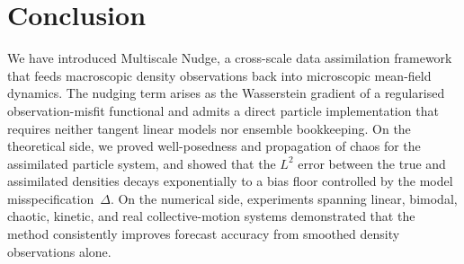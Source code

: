 \section{Conclusion}

We have introduced Multiscale Nudge, a cross-scale data assimilation
framework that feeds macroscopic density observations back into
microscopic mean-field dynamics. The nudging term arises as the
Wasserstein gradient of a regularised observation-misfit functional and
admits a direct particle implementation that requires neither tangent
linear models nor ensemble bookkeeping. On the theoretical side, we
proved well-posedness and propagation of chaos for the assimilated
particle system, and showed that the $L^2$ error between the true and
assimilated densities decays exponentially to a bias floor controlled by
the model misspecification~$\Delta$. On the numerical side, experiments
spanning linear, bimodal, chaotic, kinetic, and real collective-motion
systems demonstrated that the method consistently improves forecast
accuracy from smoothed density observations alone.
